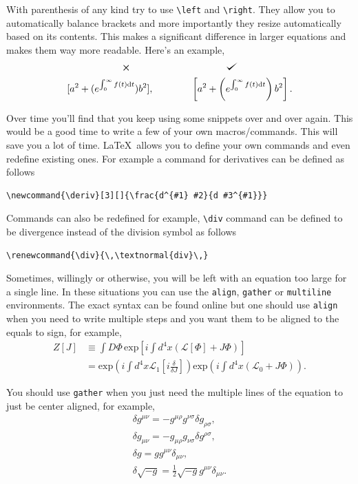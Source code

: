 \documentclass[english,10pt,a4paper, openany, oneside]{book}
\def\checkmark{\tikz\fill[scale=0.4](0,.35) -- (.25,0) -- (1,.7) -- (.25,.15) -- cycle;}
\begin{document}
	With parenthesis of any kind try to use \lstinline|\left| and \lstinline|\right|. They allow you to automatically balance brackets and more importantly they resize automatically based on its contents. This makes a significant difference in larger equations and makes them way more readable. Here's an example,
	\begin{gather}
		\bm{\times} \qquad\qquad\qquad\qquad\qquad \checkmark \nonumber\\
		[a^2 + (e^{\int_0^{\infty} f(t) \text{d}t})b^2] ,\qquad\qquad  \left[a^2 + \left(e^{\int_0^{\infty} f\left(t\right) \text{d}t}\right)b^2\right].
	\end{gather}
	
	Over time you'll find that you keep using some snippets over and over again. This would be a good time to write a few of your own macros/commands. This will save you a lot of time. \LaTeX\ allows you to define your own commands and even redefine existing ones. For example a command for derivatives can be defined as follows
	\begin{lstlisting}[style=mystyle]
\newcommand{\deriv}[3][]{\frac{d^{#1} #2}{d #3^{#1}}}\end{lstlisting}
	Commands can also be redefined for example, \lstinline[style=mystyle]|\div| command can be defined to be divergence instead of the division symbol as follows
	\begin{lstlisting}[style=mystyle]
\renewcommand{\div}{\,\textnormal{div}\,}\end{lstlisting}

	Sometimes, willingly or otherwise, you will be left with an equation too large for a single line. In these situations you can use the \verb*|align|, \verb*|gather| or \verb*|multiline| environments. The exact syntax can be found online but one should use \verb*|align| when you need to write multiple steps and you want them to be aligned to the equals to sign, for example,
	\begin{align}
		Z[J] &\equiv \int{D\Phi \, \text{exp}\left[i \int{d^4 x}(\mathscr{L}[\Phi]+J\Phi)\right]} \nonumber \\
		&= \text{exp}\left(i \int{d^4x}\mathscr{L}_1\left[i \frac{\delta}{\delta J}\right]\right) \text{exp}\left(i \int{d^4x }(\mathscr{L}_0 +J\Phi) \right) .\label{eq:Z}
	\end{align}
	
	You should use \verb*|gather| when you just need the multiple lines of the equation to just be center aligned, for example,
	\begin{gather}
		\delta g^{\mu\nu} = - g^{\mu \rho}g^{\nu \sigma} \delta g_{\rho \sigma}, \\
		\delta g_{\mu\nu} = - g_{\mu \rho}g_{\nu \sigma} \delta g^{\rho \sigma}, \\
		\delta g  = g g^{\mu\nu} \delta_{\mu\nu}, \\
		\delta \sqrt{-g}  = \frac{1}{2}\sqrt{-g} g^{\mu\nu} \delta_{\mu\nu}. \label{eq:var-detg}
	\end{gather}
	
\end{document}
